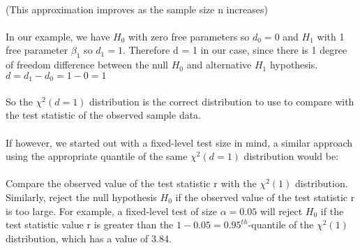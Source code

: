 \documentclass[11pt]{article}   	%
\begin{document}
\\
(This approximation improves as the sample size n increases) \\
\\
In our example, we have $ H_0 $ with zero free parameters so $ d_0 = 0 $ and $ H_1 $ with 1 free parameter $ \beta_1 $ so $ d_1 = 1 $. Therefore d = 1 in our case, since there is 1 degree of freedom difference between the null $ H_0 $ and alternative $ H_1 $ hypothesis. $ d = d_1 - d_0 = 1 - 0 = 1 $ \\
\\
So the $ \chi^2(d=1) $ distribution is the correct distribution to use to compare with the test statistic of the observed sample data. \\
\\
If however, we started out with a fixed-level test size in mind, a similar approach using the appropriate quantile of the same $ \chi^2(d=1) $ distribution would be: \\
\\
Compare the observed value of the test statistic r with the $ \chi^2(1) $ distribution. Similarly, reject the null hypothesis $ H_0 $ if the observed value of the test statistic r is too large. For example, a fixed-level test of size $ \alpha = 0.05 $ will reject $ H_0 $ if the test statistic value r is greater than the $ 1 - 0.05 = 0.95^{th}$-quantile of the $ \chi^2(1) $ distribution, which has a value of 3.84.


\break
\end{document}
